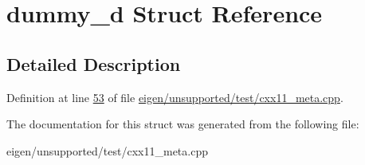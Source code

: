 \hypertarget{structdummy__d}{}\section{dummy\+\_\+d Struct Reference}
\label{structdummy__d}


\subsection{Detailed Description}


Definition at line \hyperlink{eigen_2unsupported_2test_2cxx11__meta_8cpp_source_l00053}{53} of file \hyperlink{eigen_2unsupported_2test_2cxx11__meta_8cpp_source}{eigen/unsupported/test/cxx11\+\_\+meta.\+cpp}.



The documentation for this struct was generated from the following file\+:\begin{DoxyCompactItemize}
\item 
eigen/unsupported/test/cxx11\+\_\+meta.\+cpp\end{DoxyCompactItemize}
